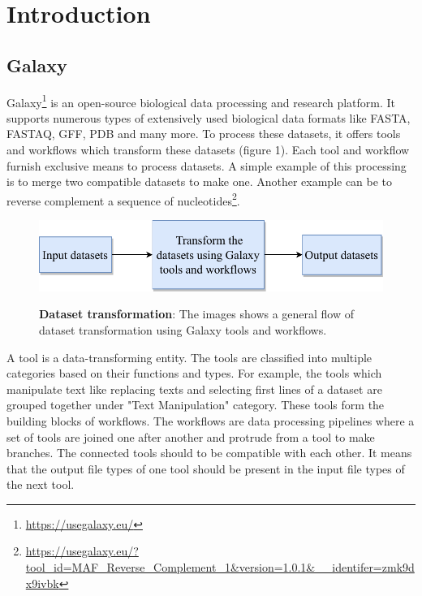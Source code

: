 \chapter{Introduction}\label{chap:introduction}
\section{Galaxy}
Galaxy{\footnote{\url{https://usegalaxy.eu/}}} is an open-source biological data processing and research platform. It supports numerous types of extensively used biological data formats like FASTA, FASTAQ, GFF, PDB and many more. To process these datasets, it offers tools and workflows which transform these datasets (figure 1). Each tool and workflow furnish exclusive means to process datasets. A simple example of this processing is to merge two compatible datasets to make one. Another example can be to reverse complement a sequence of 
nucleotides\footnote{\url{https://usegalaxy.eu/?tool_id=MAF_Reverse_Complement_1&version=1.0.1&__identifer=zmk9dx9ivbk}}.

\begin{figure}[h]
\begin{centering}
    {\includegraphics[scale=0.8]{figures/image_Galaxy_1.pdf}}
    \caption[Basic flow of dataset transformation]{\textbf{Dataset transformation}: The images shows a general flow of dataset transformation using Galaxy tools and workflows.}
\end{centering}
\end{figure}

A tool is a data-transforming entity. The tools are classified into multiple categories based on their functions and types. For example, the tools which manipulate text like replacing texts and selecting first lines of a dataset are grouped together under "Text Manipulation" category. These tools form the building blocks of workflows. The workflows are data processing pipelines where a set of tools are joined one after another and protrude from a tool to make branches. The connected tools should to be compatible with each other. It means that the output file types of one tool should be present in the input file types of the next tool.

